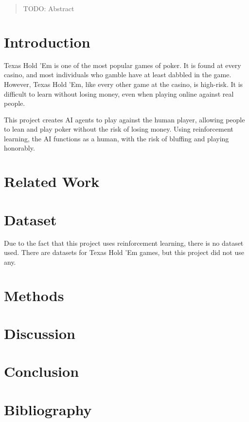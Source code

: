 \documentclass{article}
\theoremstyle{plain}
\theoremstyle{definition}
\theoremstyle{remark}
\begin{document}

\begin{abstract}
TODO: Abstract
\end{abstract}

\section{Introduction}
Texas Hold 'Em is one of the most popular games of poker. It is found at every casino, and most 
individuals who gamble have at least dabbled in the game. However, Texas Hold 'Em, like every other 
game at the casino, is high-risk. It is difficult to learn without losing money, even when playing
online against real people.

This project creates AI agents to play against the human player, allowing people to lean and play poker
without the risk of losing money. Using reinforcement learning, the AI functions as a human, with
the risk of bluffing and playing honorably. 

\section{Related Work}

\section{Dataset}
Due to the fact that this project uses reinforcement learning, there is no dataset used. There are 
datasets for Texas Hold 'Em games, but this project did not use any.

\section{Methods}

\section{Discussion}

\section{Conclusion}

\section{Bibliography}
\end{document}
